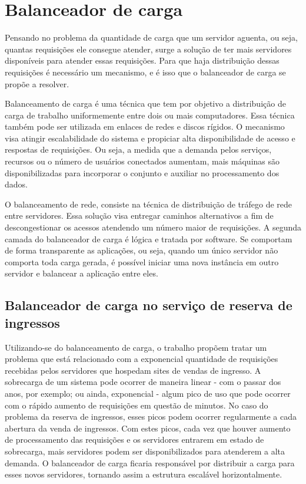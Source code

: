 \chapter{Balanceador de carga}\label{balanceador-de-carga}

Pensando no problema da quantidade de carga que um servidor aguenta, ou seja, quantas requisições ele consegue atender,
surge a solução de ter mais servidores disponíveis para atender essas requisições.
Para que haja distribuição dessas requisições é necessário um mecanismo, e é isso que o balanceador de carga se
propõe a resolver.

Balanceamento de carga é uma técnica que tem por objetivo a distribuição de carga de trabalho uniformemente entre dois ou
mais computadores. Essa técnica também pode ser utilizada em enlaces de redes e discos rígidos. O mecanismo visa atingir
escalabilidade do sistema e propiciar alta disponibilidade de acesso e respostas de requisições. Ou seja, a medida que a
demanda pelos serviços, recursos ou o número de usuários conectados aumentam, mais máquinas são disponibilizadas para incorporar
o conjunto e auxiliar no processamento dos dados.


O balanceamento de rede, consiste na técnica de distribuição de tráfego de rede entre servidores. Essa solução visa entregar
caminhos alternativos a fim de descongestionar os acessos atendendo um número maior de requisições. A segunda camada do
balanceador de carga é lógica e tratada por software. Se comportam de forma transparente
as aplicações, ou seja, quando um único servidor não comporta toda carga gerada, é possível iniciar uma nova instância em
outro servidor e balancear a aplicação entre eles.

\section{Balanceador de carga no serviço de reserva de ingressos}

Utilizando-se do balanceamento de carga, o trabalho propõem tratar um problema que está relacionado com a exponencial
quantidade de requisições recebidas pelos servidores que hospedam sites de vendas de ingresso. A sobrecarga de um
sistema pode ocorrer de maneira linear - com o passar dos anos, por exemplo; ou ainda, exponencial - algum pico de uso
que pode ocorrer com o rápido aumento de requisições em questão de minutos.
No caso do problema da reserva de ingressos, esses picos podem ocorrer regularmente a cada abertura da venda de ingressos.
Com estes picos, cada vez que houver aumento de processamento das requisições e os servidores entrarem em
estado de sobrecarga, mais servidores podem ser disponibilizados para atenderem a alta demanda.
O balanceador de carga ficaria responsável por distribuir a carga para esses novos servidores,
tornando assim a estrutura escalável horizontalmente.

